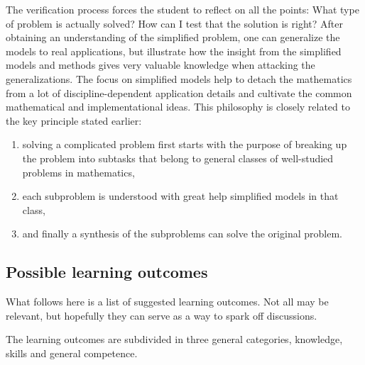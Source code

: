 \documentclass[%
oneside,                 %
final,                   %
10pt]{article}
\begin{document}
\noindent
The verification process forces the student to reflect on all the points: What type of problem is actually solved? How can I test that the solution is right?
After obtaining an understanding of the simplified problem, one can generalize the models to real applications, but illustrate how the insight from the simplified models and methods gives very valuable knowledge when attacking the generalizations. The focus on simplified models help to detach the mathematics from a lot of discipline-dependent application details and cultivate the common mathematical and implementational ideas.
This philosophy is closely related to the key principle stated earlier:
\begin{enumerate}
\item solving a complicated problem first starts with the purpose of breaking up the problem into subtasks that belong to general classes of well-studied problems in mathematics,

\item each subproblem is understood with great help simplified models in that class,

\item and finally a synthesis of the subproblems can solve the original problem.
\end{enumerate}

\noindent
\subsection*{Possible learning outcomes}


What follows here is a list of suggested learning outcomes. Not all may be relevant, but hopefully they can serve as 
a way to spark off discussions.

The learning outcomes are subdivided in three general categories, knowledge, skills and general competence.
\end{document}
